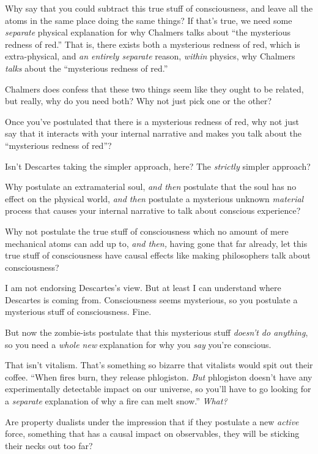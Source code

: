 {
 Why say that you could subtract this true stuff of consciousness,
and leave all the atoms in the same place doing the same things? If
that's true, we need some \textit{separate} physical
explanation for why Chalmers talks about ``the
mysterious redness of red.'' That is, there exists
both a mysterious redness of red, which is extra-physical, and
\textit{an entirely separate} reason, \textit{within} physics, why
Chalmers \textit{talks} about the ``mysterious redness
of red.''}

{
 Chalmers does confess that these two things seem like they ought
to be related, but really, why do you need both? Why not just pick one
or the other?}

{
 Once you've postulated that there is a mysterious
redness of red, why not just say that it interacts with your internal
narrative and makes you talk about the ``mysterious
redness of red''?}

{
 Isn't Descartes taking the simpler approach, here?
The \textit{strictly} simpler approach?}

{
 Why postulate an extramaterial soul, \textit{and then} postulate
that the soul has no effect on the physical world, \textit{and then}
postulate a mysterious unknown \textit{material} process that causes
your internal narrative to talk about conscious experience?}

{
 Why not postulate the true stuff of consciousness which no amount
of mere mechanical atoms can add up to, \textit{and then,} having gone
that far already, let this true stuff of consciousness have causal
effects like making philosophers talk about consciousness?}

{
 I am not endorsing Descartes's view. But at least
I can understand where Descartes is coming from. Consciousness seems
mysterious, so you postulate a mysterious stuff of consciousness.
Fine.}

{
 But now the zombie-ists postulate that this mysterious stuff
\textit{doesn't do anything}, so you need a
\textit{whole new} explanation for why you \textit{say}
you're conscious.}

{
 That isn't vitalism. That's
something so bizarre that vitalists would spit out their coffee.
``When fires burn, they release phlogiston.
\textit{But} phlogiston doesn't have any experimentally
detectable impact on our universe, so you'll have to go
looking for a \textit{separate} explanation of why a fire can melt
snow.'' \textit{What?}}

{
 Are property dualists under the impression that if they postulate
a new \textit{active} force, something that has a causal impact on
observables, they will be sticking their necks out too far?}

